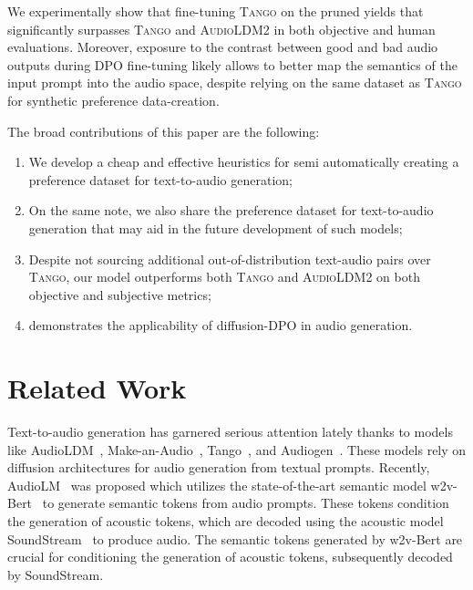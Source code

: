 We experimentally show that fine-tuning \textsc{Tango} on the pruned \dataset{} yields \model{} that significantly surpasses \textsc{Tango} and \textsc{AudioLDM2} in both objective and human evaluations. Moreover, exposure to the contrast between good and bad audio outputs during DPO fine-tuning likely allows \model{} to better map the semantics of the input prompt into the audio space, despite relying on the same dataset as \textsc{Tango} for synthetic preference data-creation.

The broad contributions of this paper are the following:
\begin{enumerate}%
    \item We develop a cheap and effective heuristics for semi automatically creating a preference dataset for text-to-audio generation;
    \item On the same note, we also share the preference dataset \dataset{} for text-to-audio generation that may aid in the future development of such models;
    \item Despite not sourcing additional out-of-distribution text-audio pairs over \textsc{Tango}, our model \model{} outperforms both \textsc{Tango} and \textsc{AudioLDM2} on both objective and subjective metrics;
    \item \model{} demonstrates the applicability of diffusion-DPO in audio generation.
\end{enumerate}

\section{Related Work}
\label{sec:related-work}

Text-to-audio generation has garnered serious attention lately thanks to models like AudioLDM~\cite{liu2023audioldm}, Make-an-Audio~\cite{huang2023make}, Tango~\cite{ghosal2023text}, and Audiogen~\cite{kreuk2022audiogen}. These models rely on diffusion architectures for audio generation from textual prompts. Recently, AudioLM~\cite{borsos2023audiolm} was proposed which utilizes the state-of-the-art semantic model w2v-Bert~\cite{DBLP:conf/asru/ChungZHCQPW21} to generate semantic tokens from audio prompts. These tokens condition the generation of acoustic tokens, which are decoded using the acoustic model SoundStream~\cite{DBLP:journals/taslp/ZeghidourLOST22} to produce audio. The semantic tokens generated by w2v-Bert are crucial for conditioning the generation of acoustic tokens, subsequently decoded by SoundStream.

